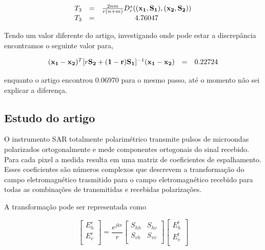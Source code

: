\documentclass[10pt,a4paper]{article}
\begin{document}
\begin{description}
\begin{equation}\label{sec3eqn4}
\begin{array}{ccc}
	T_3&=&\frac{2nm}{r(n+m)}D_r^s(({\bf x_1}, {\bf S_1}),({\bf x_2}, {\bf S_2})) \\
	T_3&=&4.76047
\end{array}
\end{equation}

Tendo um valor diferente do artigo, investigando onde pode estar a discrepância encontramos o seguinte valor para, 

\begin{equation}\label{sec3eqn5}
\begin{array}{ccc}
	({\bf x_1}-{\bf x_2})^T [r{\bf S_2+(1-r){\bf S_1}}]^{-1}({\bf x_1}-{\bf x_2})&=& 0.22724\\
\end{array}
\end{equation}

enquanto o artigo encontrou $0.06970$ para o mesmo passo, até o momento não sei explicar a diferença.

\end{description}


\subsection{Estudo do artigo  \cite{anfinsen2009}}

O instrumento SAR totalmente polarimétrico transmite pulsos de microondas polarizados ortogonalmente e mede componentes ortogonais do sinal recebido. Para cada pixel a medida resulta em uma matriz de coeficientes de espalhamento. Esses coeficientes são números complexos que descrevem a transformação do campo eletromagnético trasmitido para o campo eletromagnético recebido para todas as combinações de transmitidas e recebidas polarizações.

A transformação pode ser representada como

\begin{equation}\label{sec4eqn1}
 \left[
\begin{array}{c}
	E_{h}^{r}   \\
	E_{v}^{r}    \\
\end{array}
\right]
 = \frac{e^{jkr}}{r}\left[
\begin{array}{cc}
	S_{hh}   & S_{hv}   \\
	S_{vh}   & S_{vv}   \\
\end{array}
\right]
 \left[
\begin{array}{c}
	E_{h}^{t}   \\
	E_{v}^{t}    \\
\end{array}
\right]
\end{equation}
\end{document}
